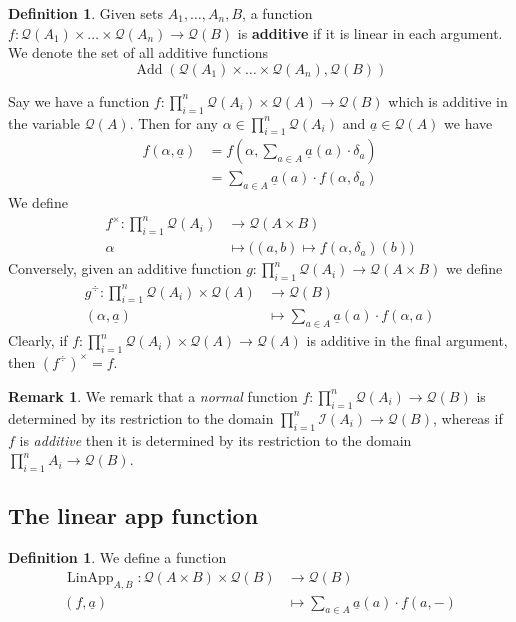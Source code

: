 \documentclass[12pt]{article}
\theoremstyle{plain}
\theoremstyle{definition}
\newtheorem{defn}[thm]{Definition} %
\newtheorem{remark}[thm]{Remark}
\newcommand{\call}[1]{\mathcal{#1}}
\newcommand{\Ical}{\call{I}}
\newcommand{\Qcal}{\call{Q}}
\newcommand{\lto}{\longrightarrow}
\begin{document}
	\begin{defn}
		Given sets $A_1, \ldots, A_n, B$, a function $f: \Qcal(A_1) \times \ldots \times \Qcal(A_n) \lto \Qcal(B)$ is \textbf{additive} if it is linear in each argument. We denote the set of all additive functions
		\begin{equation}
			\operatorname{Add}(\Qcal(A_1) \times \ldots \times \Qcal(A_n), \Qcal(B))
			\end{equation}
		\end{defn}
	
Say we have a function $f: \prod_{i = 1}^n \call{Q}(A_i) \times \call{Q}(A) \lto \call{Q}(B)$ which is additive in the variable $\call{Q}(A)$. Then for any $\alpha \in \prod_{i = 1}^n\call{Q}(A_i)$ and $\underline{a} \in \call{Q}(A)$ we have
\begin{align*}
	f(\alpha, \underline{a}) &= f(\alpha, \sum_{a \in A}\underline{a}(a)\cdot \delta_a)\\
	&= \sum_{a \in A}\underline{a}(a) \cdot f(\alpha, \delta_a)
\end{align*}
We define
\begin{align*}
	f^\times: \prod_{i = 1}^n \call{Q}(A_i) &\lto \call{Q}(A \times B)\\
	\alpha &\longmapsto \big( (a, b) \mapsto f(\alpha, \delta_{a})(b)\big)
\end{align*}
Conversely, given an additive function $g: \prod_{i = 1}^{n}\call{Q}(A_i) \lto \call{Q}(A \times B)$ we define
\begin{align*}
	g^\div: \prod_{i = 1}^n\call{Q}(A_i) \times \call{Q}(A) &\lto \call{Q}(B)\\
(\alpha, \underline{a}) &\longmapsto \sum_{a \in A}\underline{a}(a) \cdot f(\alpha, a)
\end{align*}
Clearly, if $f: \prod_{i = 1}^n\call{Q}(A_i) \times \call{Q}(A) \lto \call{Q}(A)$ is additive in the final argument, then $(f^\div)^\times = f$.
	
	\begin{remark}
		We remark that a \emph{normal} function $f: \prod_{i=1}^n \Qcal(A_i) \lto \Qcal(B)$ is determined by its restriction to the domain $\prod_{i=1}^n\Ical(A_i) \lto \Qcal(B)$, whereas if $f$ is \emph{additive} then it is determined by its restriction to the domain $\prod_{i=1}^n A_i \lto \Qcal(B)$.
		\end{remark}

\subsection{The linear app function}
\begin{defn}
We define a function
\begin{align*}
	\operatorname{LinApp}_{A,B}: \call{Q}(A \times B) \times \call{Q}(B) &\lto \call{Q}(B)\\
	(f, \underline{a}) &\longmapsto \sum_{a \in A}\underline{a}(a)\cdot f(a, -)
\end{align*}
\end{defn}
\end{document}
